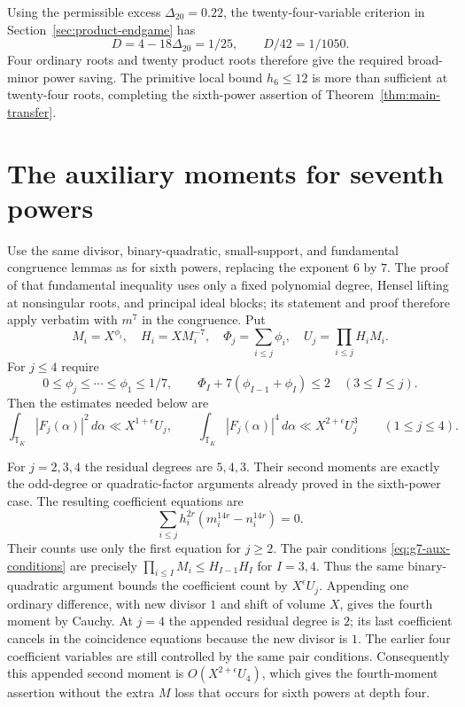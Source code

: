 \documentclass[11pt,reqno]{amsart}
\numberwithin{equation}{section}
\theoremstyle{definition}
\begin{document}
Using the permissible excess $\Delta_{20}=0.22$, the twenty-four-variable
criterion in Section~\ref{sec:product-endgame} has
\[
 D=4-18\Delta_{20}=1/25,\qquad D/42=1/1050.
\]
Four ordinary roots and twenty product roots therefore give the required
broad-minor power saving. The primitive local bound $h_6\le12$ is more than
sufficient at twenty-four roots, completing the sixth-power assertion of
Theorem~\ref{thm:main-transfer}.


\section{The auxiliary moments for seventh powers}
\label{sec:g7-auxiliary}

Use the same divisor, binary-quadratic, small-support, and fundamental
congruence lemmas as for sixth powers, replacing the exponent $6$ by $7$.
The proof of that fundamental inequality uses only a fixed polynomial degree,
Hensel lifting at nonsingular roots, and principal ideal blocks; its statement
and proof therefore apply verbatim with $m^7$ in the congruence.
Put
\[
 M_i=X^{\phi_i},\quad H_i=XM_i^{-7},\quad
 \Phi_j=\sum_{i\le j}\phi_i,\quad
 U_j=\prod_{i\le j}H_iM_i.
\]
For $j\le4$ require
\begin{equation}\label{eq:g7-aux-conditions}
 0\le\phi_j\le\cdots\le\phi_1\le1/7,
 \qquad
 \Phi_I+7(\phi_{I-1}+\phi_I)\le2\quad(3\le I\le j).
\end{equation}
Then the estimates needed below are
\begin{equation}\label{eq:g7-auxmoments}
 \int_{\mathbb T_K}|F_j(\alpha)|^2\,d\alpha
       \ll X^{1+\epsilon}U_j,\qquad
 \int_{\mathbb T_K}|F_j(\alpha)|^4\,d\alpha
       \ll X^{2+\epsilon}U_j^3
 \qquad(1\le j\le4).
\end{equation}

For $j=2,3,4$ the residual degrees are $5,4,3$.  Their second moments are
exactly the odd-degree or quadratic-factor arguments already proved in the
sixth-power case.  The resulting coefficient equations are
\[
 \sum_{i\le j}h_i^{2r}(m_i^{14r}-n_i^{14r})=0.
\]
Their counts use only the first equation for $j\ge2$.
The pair conditions \eqref{eq:g7-aux-conditions} are precisely
$\prod_{i\le I}M_i\le H_{I-1}H_I$ for $I=3,4$.
Thus the same binary-quadratic argument bounds the coefficient count by
$X^\epsilon U_j$.  Appending one ordinary difference, with new divisor $1$
and shift of volume $X$, gives the fourth moment by Cauchy.  At $j=4$ the
appended residual degree is $2$; its last coefficient cancels in the
coincidence equations because the new divisor is $1$.  The earlier four
coefficient variables are still controlled by the same pair conditions.
Consequently this appended second moment is $O(X^{2+\epsilon}U_4)$,
which gives the fourth-moment assertion without the extra $M$ loss that
occurs for sixth powers at depth four.
\end{document}
